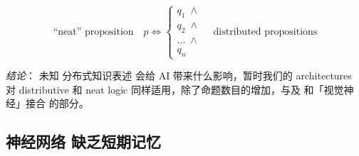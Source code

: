 \documentclass[12pt, orivec]{article}
\newcommand{\cc}[2]{#1}
\newcommand{\cc}[2]{#2}
\begin{document}
\begin{equation}
\boxed{\mbox{``neat'' proposition}} \quad p \Longleftrightarrow \left\{
                \begin{array}{l}
                  q_1 \; \wedge \\
                  q_2 \; \wedge \\
                  ... \; \wedge \\
                  q_n
                \end{array}
              \right.
\quad \boxed{\mbox{distributed propositions}}
\end{equation}

\cc{\textit{结论}： 未知 分布式知识表述 会给 AI 带来什么影响，暂时我们的 architectures 对 distributive 和 neat logic 同样适用，除了命题数目的增加，与及 和「视觉神经」接合 的部分。 
}{
\textit{Conclusion}: Unknown What is the impact of distributed knowledge representation on AI? For the time being, our architectures are equally applicable to distributive and neat logic, except for the increase in the number of propositions and the part of the "visual nerve".}


\subsection{\cc{神经网络 缺乏短期记忆}{NNs lack short-term memory mechanism}}
\end{document}
